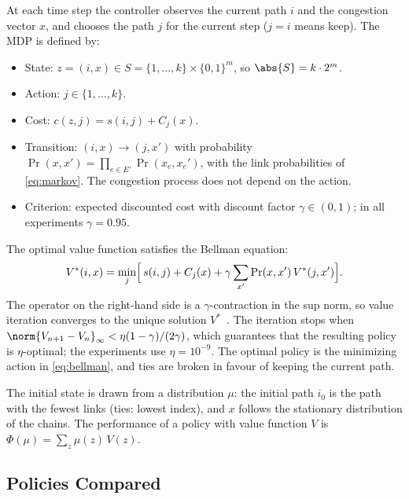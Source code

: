 At each time step the controller observes the current path $i$ and the congestion vector $x$, and chooses the path $j$ for the current step ($j = i$ means keep). The MDP is defined by:
\begin{itemize}
  \item State: $z = (i, x) \in S = \{1, \dots, k\} \times \{0,1\}^m$, so $\abs{S} = k \cdot 2^m$.
  \item Action: $j \in \{1, \dots, k\}$.
  \item Cost: $c(z, j) = s(i,j) + C_j(x)$.
  \item Transition: $(i,x) \to (j,x')$ with probability $\Pr(x,x') = \prod_{e \in E'} \Pr(x_e,x_e')$, with the link probabilities of \eqref{eq:markov}. The congestion process does not depend on the action.
  \item Criterion: expected discounted cost with discount factor $\gamma \in (0,1)$; in all experiments $\gamma = 0.95$.
\end{itemize}
The optimal value function satisfies the Bellman equation:
\begin{equation}
  V^*(i,x) = \min_{j} \Bigl[\, s(i,j) + C_j(x) + \gamma \sum_{x'} \Pr(x,x')\, V^*(j,x') \Bigr].
  \label{eq:bellman}
\end{equation}
The operator on the right-hand side is a $\gamma$-contraction in the sup norm, so value iteration converges to the unique solution $V^*$~\cite{puterman1994,bertsekas}. The iteration stops when $\norm{V_{n+1} - V_n}_\infty < \eta (1-\gamma)/(2\gamma)$, which guarantees that the resulting policy is $\eta$-optimal; the experiments use $\eta = 10^{-9}$. The optimal policy is the minimizing action in \eqref{eq:bellman}, and ties are broken in favour of keeping the current path.

The initial state is drawn from a distribution $\mu$: the initial path $i_0$ is the path with the fewest links (ties: lowest index), and $x$ follows the stationary distribution of the chains. The performance of a policy with value function $V$ is $\Phi(\mu) = \sum_{z} \mu(z)\, V(z)$.

\subsection{Policies Compared}

